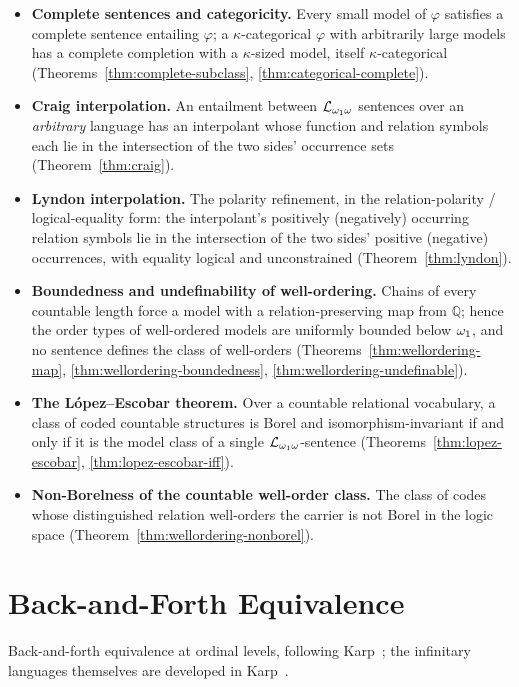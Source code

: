 \begin{itemize}
  \item \textbf{Complete sentences and categoricity.}
    Every small model of $\varphi$ satisfies a complete sentence entailing
    $\varphi$; a $\kappa$-categorical $\varphi$ with arbitrarily large models
    has a complete completion with a $\kappa$-sized model, itself
    $\kappa$-categorical (Theorems~\ref{thm:complete-subclass},
    \ref{thm:categorical-complete}).
  \item \textbf{Craig interpolation.}
    An entailment between $\mathcal{L}_{\omega_1\omega}$ sentences over an \emph{arbitrary}
    language has an interpolant whose function and relation symbols each lie in
    the intersection of the two sides' occurrence sets
    (Theorem~\ref{thm:craig}).
  \item \textbf{Lyndon interpolation.}
    The polarity refinement, in the relation-polarity / logical-equality form:
    the interpolant's positively (negatively) occurring relation symbols lie in
    the intersection of the two sides' positive (negative) occurrences, with
    equality logical and unconstrained (Theorem~\ref{thm:lyndon}).
  \item \textbf{Boundedness and undefinability of well-ordering.}
    Chains of every countable length force a model with a relation-preserving
    map from $\mathbb{Q}$; hence the order types of well-ordered models are
    uniformly bounded below $\omega_1$, and no sentence defines the class of
    well-orders (Theorems~\ref{thm:wellordering-map},
    \ref{thm:wellordering-boundedness}, \ref{thm:wellordering-undefinable}).
  \item \textbf{The L\'opez--Escobar theorem.}
    Over a countable relational vocabulary, a class of coded countable
    structures is Borel and isomorphism-invariant if and only if it is the model
    class of a single $\mathcal{L}_{\omega_1\omega}$-sentence
    (Theorems~\ref{thm:lopez-escobar}, \ref{thm:lopez-escobar-iff}).
  \item \textbf{Non-Borelness of the countable well-order class.}
    The class of codes whose distinguished relation well-orders the carrier is
    not Borel in the logic space
    (Theorem~\ref{thm:wellordering-nonborel}).
\end{itemize}

\section{Back-and-Forth Equivalence}

Back-and-forth equivalence at ordinal levels, following Karp~\cite{karp1965}; the
infinitary languages themselves are developed in Karp~\cite{karp1964}.

